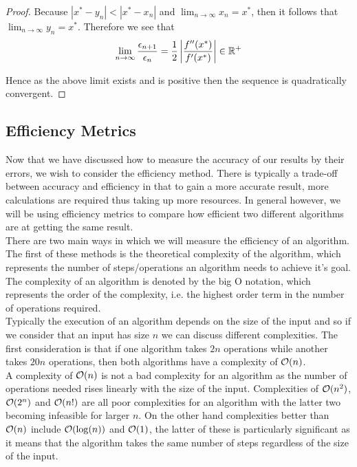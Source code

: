 \begin{Uniform Convergence Thm}
\begin{proof}
Because \(|x^\ast - y_n| < |x^\ast - x_n|\) and \(\lim_{n\to\infty}x_n = x^\ast\), then it follows that \(\lim_{n\to\infty}y_n = x^\ast\). Therefore we see that
\[\lim_{n\to\infty}\frac{\epsilon_{n+1}}{\epsilon_n} = \frac{1}{2}\left|\frac{f''(x^\ast)}{f'(x^\ast)}\right| \in \mathbb{R}^+\]

Hence as the above limit exists and is positive then the sequence is quadratically convergent.
\end{proof}

\subsection{Efficiency Metrics}
\label{SUB_"Efficiency Metrics"}

Now that we have discussed how to measure the accuracy of our results by their errors, we wish to consider the efficiency method. There is typically a trade-off between accuracy and efficiency in that to gain a more accurate result, more calculations are required thus taking up more resources. In general however, we will be using efficiency metrics to compare how efficient two different algorithms are at getting the same result.\\

There are two main ways in which we will measure the efficiency of an algorithm. The first of these methods is the theoretical complexity of the algorithm, which represents the number of steps/operations an algorithm needs to achieve it's goal. The complexity of an algorithm is denoted by the big O notation, which represents the order of the complexity, i.e. the highest order term in the number of operations required.\\

Typically the execution of an algorithm depends on the size of the input and so if we consider that an input has size \(n\) we can discuss different complexities. The first consideration is that if one algorithm takes \(2n\) operations while another takes \(20n\) operations, then both algorithms have a complexity of \(\mathcal{O}(n)\). \\

A complexity of \(\mathcal{O}(n)\) is not a bad complexity for an algorithm as the number of operations needed rises linearly with the size of the input. Complexities of \(\mathcal{O}(n^2)\), \(\mathcal{O}(2^n)\) and \(\mathcal{O}(n!)\) are all poor complexities for an algorithm\cite{ART_Complexity} with the latter two becoming infeasible for larger \(n\). On the other hand complexities better than \(\mathcal{O}(n)\) include \(\mathcal{O}(\log(n))\) and \(\mathcal{O}(1)\), the latter of these is particularly significant as it means that the algorithm takes the same number of steps regardless of the size of the input.\\


\end{Uniform Convergence Thm}
